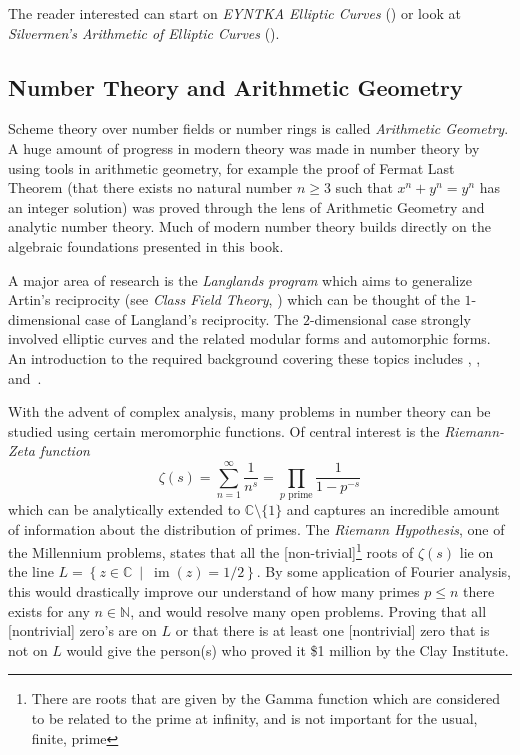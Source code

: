 \documentclass{article}
\newcommand{\C}{{\mathbb{C}}}
\newcommand{\N}{{\mathbb{N}}}
\newcommand{\im}{{\operatorname{im}}}
\newcommand{\set}[2]{\left\{#1 \ \middle|\ #2\right\}}
\begin{document}
The reader interested can start on \emph{EYNTKA Elliptic Curves} (\cite{NateEllipticCurve}) or
look at \emph{Silvermen's Arithmetic of Elliptic Curves} (\cite{silvermanArithmeticEllipticCurves2009}).


\subsection*{Number Theory and Arithmetic Geometry}

Scheme theory over number fields or number rings is called \emph{Arithmetic Geometry}. A huge amount of
progress in modern theory was made in number theory by using tools in arithmetic geometry, for example the
proof of Fermat Last Theorem (that there exists no natural number $n\ge 3$ such that $x^n+y^n=y^n$ has
an integer solution) was proved through the lens of Arithmetic Geometry and analytic number theory.
Much of modern number theory builds directly on the algebraic foundations presented in this book.

A major area of research is the \emph{Langlands program} which aims to generalize Artin's reciprocity (see
\emph{Class Field Theory}, \cite{NateCFT}) which can be thought of the $1$-dimensional case of Langland's
reciprocity. The $2$-dimensional case strongly involved elliptic curves and the related modular forms and
automorphic forms. An introduction to the required background covering these
topics includes \cite{NateEllipticCurve}, \cite{NateAlgGeo}, and~\cite{silvermanAdvancedTopicsArithmetic1994}.

With the advent of complex analysis, many problems in number theory can be studied using certain meromorphic
functions. Of central interest is the \emph{Riemann-Zeta function}
\[
	\zeta(s) = \sum_{n=1}^\infty \frac{1}{n^s} = \prod_{p\text{ prime}} \frac{1}{1-p^{-s}}
\]
which can be analytically extended to $\C\setminus\{1\}$ and captures an incredible amount of information
about the distribution of primes. The \emph{Riemann Hypothesis}, one of the Millennium problems, states that all the
[non-trivial]\footnote{There are roots that are given by the Gamma function which are considered to be related
to the prime at infinity, and is not important for the usual, finite, prime} roots of $\zeta(s)$ lie on
the line $L = \set{z \in \C}{\im(z) = 1/2}$. By some application of Fourier analysis, this would drastically
improve our understand of how many primes $p\le n$ there exists for any $n \in \N$, and would resolve many
open problems. Proving that all [nontrivial] zero's are on $L$ or that there is at least one [nontrivial] zero
that is not on $L$ would give the person(s) who proved it \$1 million by the Clay Institute.
\end{document}
